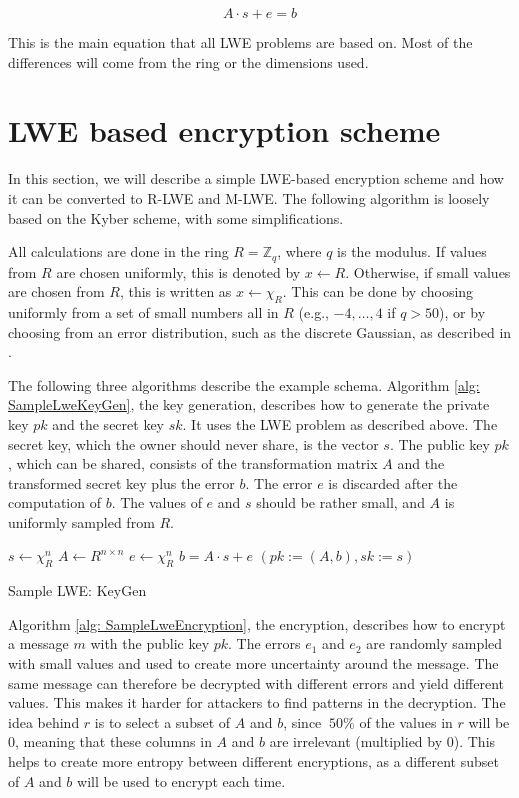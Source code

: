 $$
  A \cdot s + e = b
$$

This is the main equation that all LWE problems are based on. Most of the differences will come from the ring or the dimensions used.


\section{LWE based encryption scheme}
\label{sec:Lwe-Encryption}

In this section, we will describe a simple LWE-based encryption scheme and how it can be converted to R-LWE and M-LWE. The following algorithm is loosely based on the Kyber \cite{CyrstalsKyber} scheme, with some simplifications.

All calculations are done in the ring $R = \mathbb{Z}_q$, where $q$ is the modulus. If values from $R$ are chosen uniformly, this is denoted by $x \leftarrow R$. Otherwise, if small values are chosen from $R$, this is written as $x \leftarrow \chi_R$. This can be done by choosing uniformly from a set of small numbers all in $R$ (e.g., ${-4,\ldots, 4}$ if $q>50$), or by choosing from an error distribution, such as the discrete Gaussian, as described in \cite{Regev2005OnLL}.

The following three algorithms describe the example schema. Algorithm \ref{alg: SampleLweKeyGen}, the key generation, describes how to generate the private key $pk$ and the secret key $sk$. It uses the LWE problem as described above. The secret key, which the owner should never share, is the vector $s$. The public key $pk$, which can be shared, consists of the transformation matrix $A$ and the transformed secret key plus the error $b$. The error $e$ is discarded after the computation of $b$. The values of $e$ and $s$ should be rather small, and $A$ is uniformly sampled from $R$.

\begin{algorithm}[htb]
  \begin{algorithmic}[1]
    \STATE $s \leftarrow \chi_R^n$
    \STATE $A \leftarrow R^{n \times n}$
    \STATE $e \leftarrow \chi_R^n$
    \STATE $b = A\cdot s+e$
    \RETURN $(pk:=(A, b), sk:=s )$
  \end{algorithmic}
  \caption{Sample LWE: KeyGen}
  \label{alg: SampleLweKeyGen}
\end{algorithm}

Algorithm \ref{alg: SampleLweEncryption}, the encryption, describes how to encrypt a message $m$ with the public key $pk$. The errors $e_1$ and $e_2$ are randomly sampled with small values and used to create more uncertainty around the message. The same message can therefore be decrypted with different errors and yield different values. This makes it harder for attackers to find patterns in the decryption. The idea behind $r$ is to select a subset of $A$ and $b$, since $~50\%$ of the values in $r$ will be $0$, meaning that these columns in $A$ and $b$ are irrelevant (multiplied by $0$). This helps to create more entropy between different encryptions, as a different subset of $A$ and $b$ will be used to encrypt each time.

